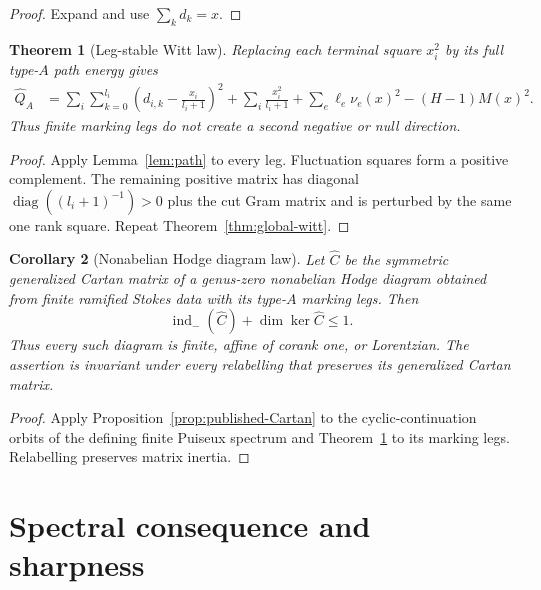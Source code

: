 \documentclass[11pt,a4paper]{amsart}
\theoremstyle{plain}
\newtheorem{theorem}{Theorem}[section]
\newtheorem{corollary}[theorem]{Corollary}
\theoremstyle{definition}
\newcommand{\indm}{\operatorname{ind}_{-}}
\begin{document}
\begin{proof}
Expand and use $\sum_kd_k=x$.
\end{proof}

\begin{theorem}[Leg-stable Witt law]\label{thm:legs}
Replacing each terminal square $x_i^2$ by its full type-$A$ path energy gives
\begin{align}\label{eq:leg-law}
 \widehat Q_A
 &=\sum_i\sum_{k=0}^{l_i}\left(d_{i,k}-\frac{x_i}{l_i+1}\right)^2
   +\sum_i\frac{x_i^2}{l_i+1}
   +\sum_e\ell_e\nu_e(x)^2-(H-1)M(x)^2.
\end{align}
Thus finite marking legs do not create a second negative or null direction.
\end{theorem}

\begin{proof}
Apply Lemma~\ref{lem:path} to every leg.  Fluctuation squares form a positive complement.  The
remaining positive matrix has diagonal $\operatorname{diag}((l_i+1)^{-1})>0$ plus the cut Gram
matrix and is perturbed by the same one rank square.  Repeat Theorem~\ref{thm:global-witt}.
\end{proof}

\begin{corollary}[Nonabelian Hodge diagram law]\label{cor:nah-diagram}
Let $\widehat C$ be the symmetric generalized Cartan matrix of a genus-zero nonabelian Hodge
diagram obtained from finite ramified Stokes data with its type-$A$ marking legs.  Then
\begin{equation}\label{eq:nah-diagram-law}
                  \indm(\widehat C)+\dim\ker\widehat C\leq1.
\end{equation}
Thus every such diagram is finite, affine of corank one, or Lorentzian.  The assertion is invariant
under every relabelling that preserves its generalized Cartan matrix.
\end{corollary}

\begin{proof}
Apply Proposition~\ref{prop:published-Cartan} to the cyclic-continuation orbits of the defining
finite Puiseux spectrum and Theorem~\ref{thm:legs} to its marking legs.  Relabelling preserves
matrix inertia.
\end{proof}

\section{Spectral consequence and sharpness}\label{sec:spectral}
\end{document}
